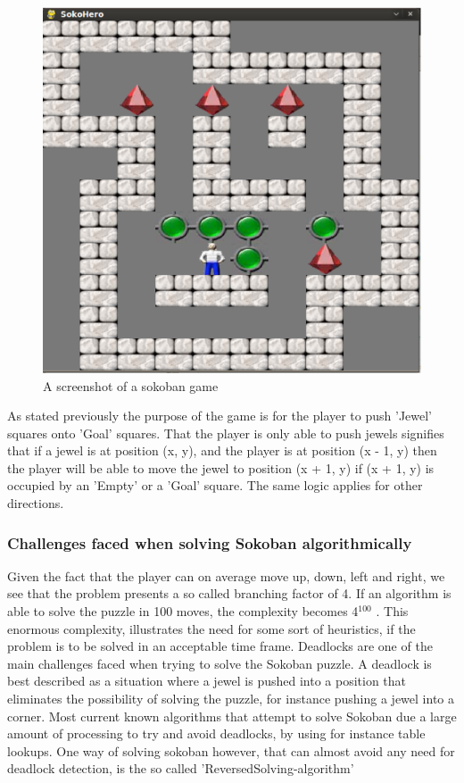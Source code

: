 \begin{figure}[ht]
\centering
\includegraphics[scale=0.25]{images/sokohero.eps}
\caption{A screenshot of a sokoban game}
\label{fig:sokohero}
\end{figure}


As stated previously the purpose of the game is for the player to push 'Jewel' squares onto 'Goal' squares. That the player is only able to push jewels signifies that if a jewel is at position (x, y), and the player is at position (x - 1, y) then the player will be able to move the jewel to position (x + 1, y) if (x + 1, y) is occupied by an 'Empty' or a 'Goal' square. The same logic applies for other directions.
 
\subsubsection{Challenges faced when solving Sokoban algorithmically}
Given the fact that the player can on average move up, down, left and right, we see that the problem presents a so called branching factor of 4. If an algorithm is able to solve the puzzle in 100 moves, the complexity becomes 4$^{100}$ . 
This enormous complexity, illustrates the need for some sort of heuristics, if the problem is to be solved in an acceptable time frame.
Deadlocks are one of the main challenges faced when trying to solve the Sokoban puzzle. A deadlock is best described as a situation where a jewel is pushed into a position that eliminates the possibility of solving the puzzle, for instance pushing a jewel into a corner. Most current known algorithms that attempt to solve Sokoban due a large amount of processing to try and avoid deadlocks, by using for instance table lookups. One way of solving sokoban however, that can almost avoid any need for deadlock detection, is the so called 'ReversedSolving-algorithm'\cite{franktakes}

